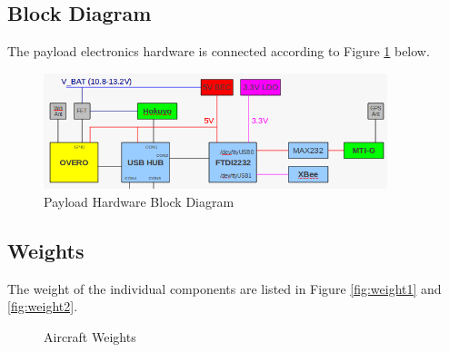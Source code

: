 \documentclass[a4paper,11pt]{report}
\begin{document}
\subsection{Block Diagram}

The payload electronics hardware is connected according to Figure \ref{fig:hwdiagram} below.

\begin{figure}[ht]
 \centering
 \includegraphics[width=10cm]{payload_hardware_block_diagram.png}
 \caption{Payload Hardware Block Diagram}
 \label{fig:hwdiagram}
\end{figure}

\subsection{Weights}

The weight of the individual components are listed in Figure \ref{fig:weight1} and \ref{fig:weight2}.

\begin{figure}[ht]
  \centering
  \caption{Aircraft Weights}
  \label{fig:weights}
\end{figure} 
\end{document}
